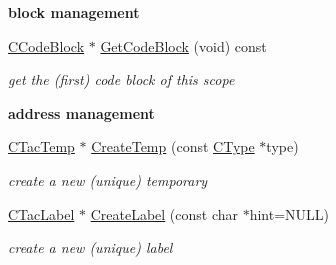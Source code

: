 \begin{Indent}{\bf block management}\par
\begin{DoxyCompactItemize}
\item 
\hypertarget{classCScope_a077b1f7fe581afd9e7df9888be6e5738}{\hyperlink{classCCodeBlock}{C\-Code\-Block} $\ast$ \hyperlink{classCScope_a077b1f7fe581afd9e7df9888be6e5738}{Get\-Code\-Block} (void) const }\label{classCScope_a077b1f7fe581afd9e7df9888be6e5738}

\begin{DoxyCompactList}\small\item\em get the (first) code block of this scope \end{DoxyCompactList}\end{DoxyCompactItemize}
\end{Indent}
\begin{Indent}{\bf address management}\par
\begin{DoxyCompactItemize}
\item 
\hyperlink{classCTacTemp}{C\-Tac\-Temp} $\ast$ \hyperlink{classCScope_aab0327ef4227f3949d865c1d86ddd0ff}{Create\-Temp} (const \hyperlink{classCType}{C\-Type} $\ast$type)
\begin{DoxyCompactList}\small\item\em create a new (unique) temporary \end{DoxyCompactList}\item 
\hyperlink{classCTacLabel}{C\-Tac\-Label} $\ast$ \hyperlink{classCScope_ae53be5ef4090db0beafe3180dc37a812}{Create\-Label} (const char $\ast$hint=N\-U\-L\-L)
\begin{DoxyCompactList}\small\item\em create a new (unique) label \end{DoxyCompactList}\end{DoxyCompactItemize}
\end{Indent}
